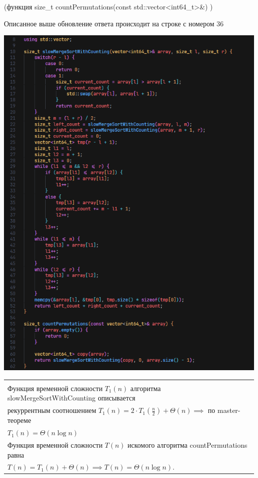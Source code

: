 \documentclass[11pt,a4paper]{article} %
\begin{document}
(функция {\large size\_t countPermutations(const std::vector<int64\_t>\&)} )

Описанное выше обновление ответа происходит на строке с номером 36

\includegraphics[scale=0.9]{a4_code_1.png}

\begin{tabular}{l}
    \\
    \\
    Функция временной сложности $ T_1(n) $ алгоритма slowMergeSortWithCounting описывается \\
    рекуррентным соотношением $ T_1(n) = 2 \cdot T_1(\frac{n}{2}) + \Theta(n) \implies $ по master-теореме \\
    $ T_1(n) = \Theta(n \log n) $ \\
    Функция временной сложности $ T(n) $ искомого алгоритма countPermutations равна \\
    $ T(n) = T_1(n) + \Theta(n) \implies T(n) = \Theta(n \log n) $.
\end{tabular}
\end{document}

